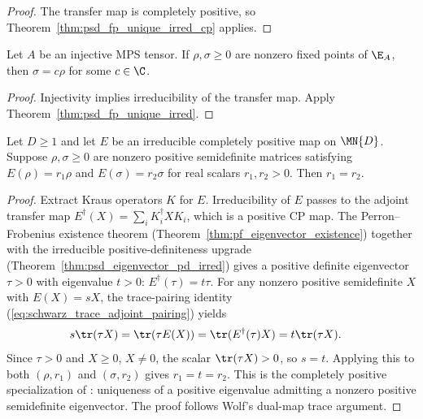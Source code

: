 \begin{proof}\leanok
    The transfer map is completely positive, so
    Theorem~\ref{thm:psd_fp_unique_irred_cp} applies.
\end{proof}

\begin{theorem}
    \label{thm:psd_fp_unique}
    \leanok
    Let $A$ be an injective MPS tensor. If $\rho,\sigma\geq0$ are nonzero
    fixed points of $\E_A$, then $\sigma=c\rho$ for some $c\in\C$.
\end{theorem}

\begin{proof}\leanok
    Injectivity implies irreducibility of the transfer map. Apply
    Theorem~\ref{thm:psd_fp_unique_irred}.
\end{proof}

\begin{theorem}%
    \label{thm:eigenvalue_unique_irred}
    \leanok
    Let $D \ge 1$ and let $E$ be an irreducible completely positive map
    on $\MN{D}$.
    Suppose $\rho, \sigma \ge 0$ are nonzero positive semidefinite matrices
    satisfying $E(\rho) = r_1\rho$ and $E(\sigma) = r_2\sigma$
    for real scalars $r_1, r_2 > 0$.
    Then $r_1 = r_2$.
\end{theorem}

\begin{proof}
    \leanok
    Extract Kraus operators $K$ for $E$.
    Irreducibility of $E$ passes to the adjoint transfer map
    $E^\dagger(X) = \sum_i K_i^\dagger X K_i$,
    which is a positive CP map.
    The Perron--Frobenius existence theorem
    (Theorem~\ref{thm:pf_eigenvector_existence}) together with the
    irreducible positive-definiteness upgrade
    (Theorem~\ref{thm:psd_eigenvector_pd_irred}) gives a positive definite
    eigenvector $\tau > 0$ with eigenvalue $t > 0$:
    $E^\dagger(\tau) = t\tau$.
    For any nonzero positive semidefinite $X$ with $E(X) = sX$, the
    trace-pairing identity (\ref{eq:schwarz_trace_adjoint_pairing}) yields
    \begin{align}
        s\tr(\tau X)
         & = \tr(\tau E(X))
        = \tr(E^\dagger(\tau)X)
        = t\tr(\tau X).
        \notag
    \end{align}
    Since $\tau > 0$ and $X \ge 0$, $X \neq 0$, the scalar
    $\tr(\tau X) > 0$, so $s = t$.
    Applying this to both $(\rho,r_1)$ and $(\sigma,r_2)$
    gives $r_1 = t = r_2$.
    This is the completely positive specialization of
    \cite[Theorem~6.3(3)]{Wolf2012Quantum}: uniqueness of a positive
    eigenvalue admitting a nonzero positive semidefinite eigenvector.
    The proof follows Wolf's dual-map trace argument.
\end{proof}

